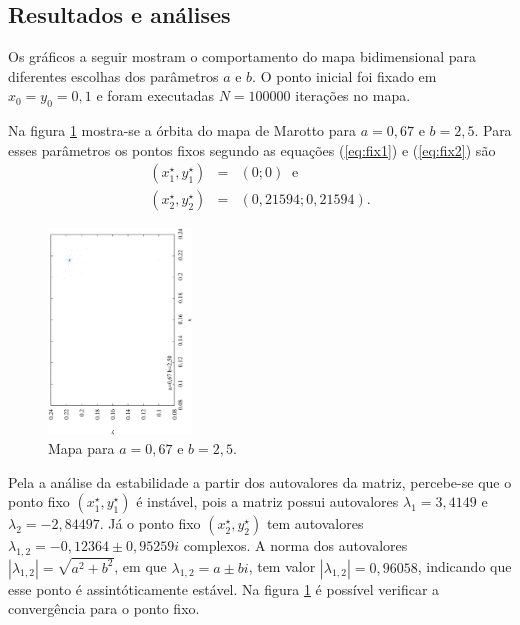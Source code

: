 \documentclass[brazilian, 12pt, a4paper, final]{article}
\begin{document}
\begin{multicols*}{2}
\section{Resultados e análises}
Os gráficos a seguir mostram o comportamento do mapa bidimensional para diferentes escolhas dos parâmetros $a$ e $b$. O ponto inicial foi fixado em $x_0=y_0=0,1$ e foram executadas $N=100 000$ iterações no mapa.

Na figura \ref{fig:067} mostra-se a órbita do mapa de Marotto para $a=0,67$ e $b=2,5$. Para esses parâmetros os pontos fixos segundo as equações (\ref{eq:fix1}) e (\ref{eq:fix2}) são 
\begin{eqnarray}
	\nonumber (x^{\star}_1,y^{\star}_1)&=&(0; 0) \;\; \mathrm{e} \\
	\nonumber (x^{\star}_2,y^{\star}_2)&=&(0,21594; 0,21594).
\end{eqnarray}

\begin{figure}[H] 
  \centering
  \includegraphics[width=0.34\textwidth,angle=-90]{mapa_a067_b250.eps}
  \caption{Mapa para $a=0,67$ e $b=2,5$.}
  \label{fig:067}
\end{figure}

Pela a análise da estabilidade a partir dos autovalores da matriz, percebe-se que o ponto fixo $(x^{\star}_1,y^{\star}_1)$ é instável, pois a matriz possui autovalores $\lambda_1=3,4149$ e $\lambda_2=-2,84497$. Já o ponto fixo $(x^{\star}_2,y^{\star}_2)$ tem autovalores $\lambda_{1,2}=-0,12364\pm0,95259 i$ complexos. A norma dos autovalores $|\lambda_{1,2}|=\sqrt{a^2+b^2}$, em que $\lambda_{1,2}=a\pm b i$, tem valor $|\lambda_{1,2}|=0,96058$, indicando que esse ponto é assintóticamente estável. Na figura \ref{fig:067} é possível verificar a convergência para o ponto fixo.
   

\end{multicols*}
\end{document}
